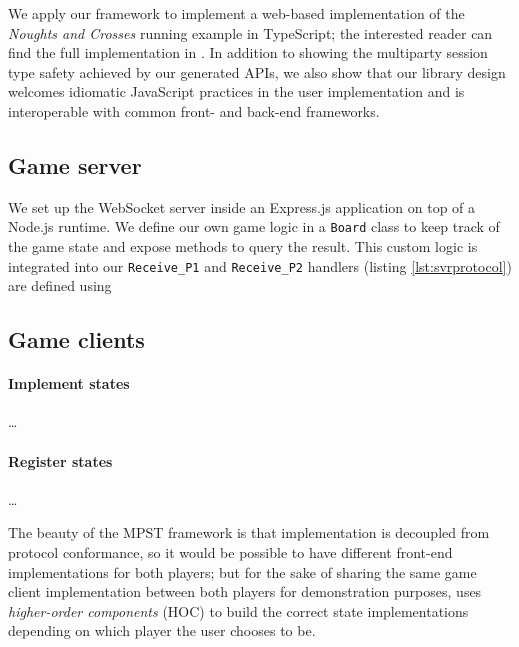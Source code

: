 \documentclass[submission,copyright,creativecommons]{eptcs}
\begin{document}
We apply our framework to implement a web-based implementation of the \textit{Noughts and Crosses} running example in TypeScript; the interested reader can find the full implementation in \cite{NoughtsAndCrosses}. In addition to showing the multiparty session type safety achieved by our generated APIs, we also show that our library design welcomes idiomatic JavaScript practices in the user implementation and is interoperable with common front- and back-end frameworks.
 
\subsection{Game server}
\label{section:exampleserver}

We set up the WebSocket server inside an Express.js \cite{ExpressJS} application on top of a Node.js \cite{NodeJS} runtime. We define our own game logic in a \texttt{Board} class to keep track of the game state and expose methods to query the result. This custom logic is integrated into our 
\texttt{Receive\_P1} and \texttt{Receive\_P2} handlers (listing \ref{lst:svrprotocol}) are defined using 





\subsection{Game clients}

\paragraph{Implement states} \dots

\paragraph{Register states} \dots

The beauty of the MPST framework is that implementation is decoupled from protocol conformance, so it would be possible to have different front-end implementations for both players; but for the sake of sharing the same game client implementation between both players for demonstration purposes, \cite{NoughtsAndCrosses} uses \textit{higher-order components} (HOC) to build the correct state implementations depending on which player the user chooses to be. 
\end{document}

